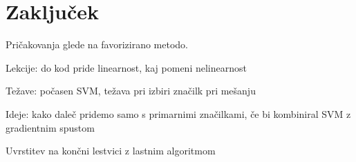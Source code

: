 \documentclass[11pt,a4paper,openany]{book}
\begin{document}
\chapter*{Zaključek}

Pričakovanja glede na favorizirano metodo.

Lekcije: do kod pride linearnost, kaj pomeni nelinearnost

Težave: počasen SVM, težava pri izbiri značilk pri mešanju

Ideje: kako daleč pridemo samo s primarnimi značilkami, če bi kombiniral SVM z gradientnim spustom

Uvrstitev na končni lestvici z lastnim algoritmom

\cite{Baldi2014}




\end{document}
